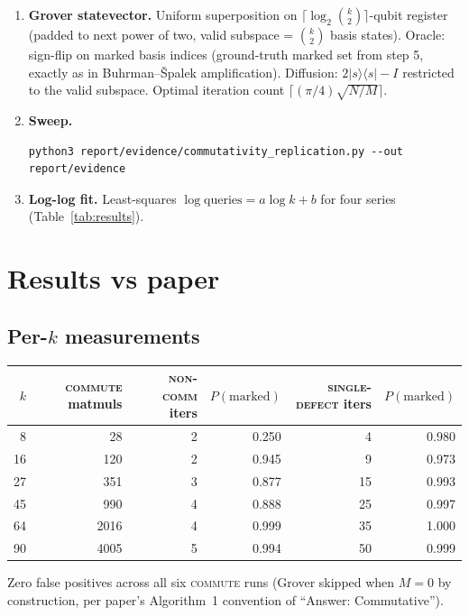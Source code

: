 \documentclass[11pt,letterpaper]{article}
\begin{document}
\begin{enumerate}
\item \textbf{Grover statevector.} Uniform superposition on $\lceil \log_2
      \binom{k}{2} \rceil$-qubit register (padded to next power of two, valid
      subspace = $\binom{k}{2}$ basis states). Oracle: sign-flip on marked
      basis indices (ground-truth marked set from step 5, exactly as in
      Buhrman--\v{S}palek amplification). Diffusion: $2\lvert s\rangle\langle
      s\rvert - I$ restricted to the valid subspace. Optimal iteration count
      $\lceil (\pi/4)\sqrt{N/M}\rceil$.

\item \textbf{Sweep.}
      \begin{lstlisting}
python3 report/evidence/commutativity_replication.py --out report/evidence
      \end{lstlisting}

\item \textbf{Log-log fit.} Least-squares $\log \text{queries} = a \log k + b$
      for four series (Table~\ref{tab:results}).
\end{enumerate}

\section{Results vs paper}
\label{sec:results}

\subsection{Per-$k$ measurements}

\begin{longtable}{@{}rrrrrr@{}}
\toprule
$k$ & \textsc{commute} matmuls & \textsc{non-comm} iters & $P(\text{marked})$ & \textsc{single-defect} iters & $P(\text{marked})$ \\
\midrule
 8  &   28 & 2 & 0.250 &  4 & 0.980 \\
16  &  120 & 2 & 0.945 &  9 & 0.973 \\
27  &  351 & 3 & 0.877 & 15 & 0.993 \\
45  &  990 & 4 & 0.888 & 25 & 0.997 \\
64  & 2016 & 4 & 0.999 & 35 & 1.000 \\
90  & 4005 & 5 & 0.994 & 50 & 0.999 \\
\bottomrule
\end{longtable}

Zero false positives across all six \textsc{commute} runs (Grover skipped when
$M=0$ by construction, per paper's Algorithm~1 convention of ``Answer:
Commutative'').
\end{document}
